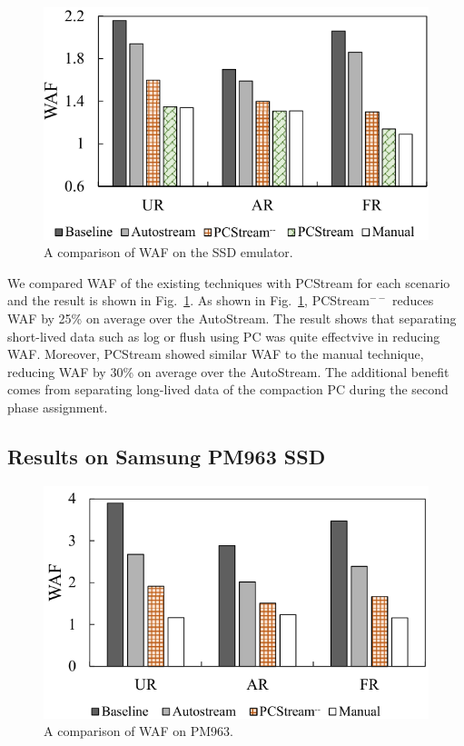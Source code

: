 \begin{figure}[t]
	\centering
	\includegraphics[width=1\linewidth]{figure/result_emul.pdf}
	\vspace{-15pt}
	\caption{A comparison of WAF on the SSD emulator.}
	\label{fig:result_emul}
	\vspace{-15pt}
\end{figure}

We compared WAF of the existing techniques with {\sf PCStream}
for each scenario and the result is shown in Fig.~\ref{fig:result_emul}. 
As shown in Fig.~\ref{fig:result_emul}, 
{\sf PCStream}$^{--}$ reduces WAF by 25\% on average over the AutoStream. 
The result shows that separating short-lived data such as log or flush
using PC was quite effectvive in reducing WAF.
Moreover, {\sf PCStream} showed similar WAF to the manual technique,
reducing WAF by 30\% on average
over the AutoStream.
The additional benefit comes from separating
long-lived data of the compaction PC during the
second phase assignment.

\subsection{Results on Samsung PM963 SSD}
\begin{figure}[t]
	\centering
	\includegraphics[width=1\linewidth]{figure/result_ssd.pdf}
	\vspace{-15pt}
	\caption{A comparison of WAF on PM963.}
	\label{fig:result_SSD}
	\vspace{-15pt}
\end{figure}

